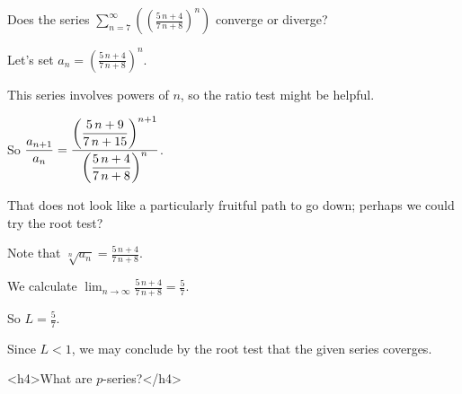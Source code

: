 \documentclass{ximera}
\begin{document}
\begin{question}
  Does the series \(\displaystyle\sum_{n=7}^\infty \left( \left(\displaystyle\frac{5 \, n + 4}{7 \, n + 8}\right)^{n} \right)\) converge or diverge?

  \begin{solution}
    \begin{hint}
      Let's set \(a_n = \left(\displaystyle\frac{5 \, n + 4}{7 \, n + 8}\right)^{n}\).
    \end{hint}
    \begin{hint}
      This series involves powers of \(n\), so the ratio test might be helpful.
    \end{hint}
    \begin{hint}
      So \(\displaystyle\displaystyle\frac{a_{n+1}}{a_n} = \displaystyle\frac{\left(\displaystyle\frac{5 \, n + 9}{7 \, n + 15}\right)^{n + 1}}{\left(\displaystyle\frac{5 \, n + 4}{7 \, n + 8}\right)^{n}}\).
    \end{hint}
    \begin{hint}
      That does not look like a particularly fruitful path to go down; perhaps we could try the root test?
    \end{hint}
    \begin{hint}
      Note that \(\sqrt[n]{a_{n}} = \displaystyle\frac{5 \, n + 4}{7 \, n + 8}\).
    \end{hint}
    \begin{hint}
      We calculate \(\lim_{n \to \infty} \displaystyle\frac{5 \, n + 4}{7 \, n + 8} = \displaystyle\frac{5}{7}\).
    \end{hint}
    \begin{hint}
      So \(L = \displaystyle\frac{5}{7}\).
    \end{hint}
    \begin{hint}
      Since \(L < 1\), we may conclude by the root test that the given series coverges.
    \end{hint}


    \begin{multiple-choice}
    \end{multiple-choice}
  \end{solution}

\end{question}
            


<h4>What are \(p\)-series?</h4>
\end{document}
